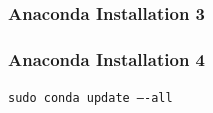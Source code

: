 \documentclass[12pt,ngerman]{beamer}
\begin{document}
\begin{frame}
\frametitle{Anaconda Installation 3}

\begin{center}
\end{center}

\end{frame}


\begin{frame}
\frametitle{Anaconda Installation 4}

\texttt{sudo conda update ----all}

\begin{center}
\end{center}

\end{frame}
\end{document}
